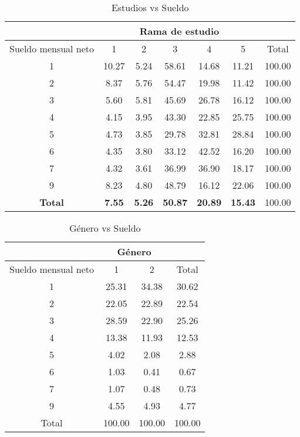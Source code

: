 \documentclass{article}
\begin{document}
\begin{table}[]
\centering
\caption{Estudios vs Sueldo}
\begin{tabular}{c|ccccc|c} \hline  \hline  
                                & \multicolumn{5}{c}{Rama de estudio}              &                     \\ \hline  
   Sueldo mensual neto                   & 1     & 2    & 3     & 4     & 5      & Total                \\ \hline  
1                               & 10.27 & 5.24 & 58.61 & 14.68 & 11.21  & 100.00               \\
2                               & 8.37  & 5.76 & 54.47 & 19.98 & 11.42  & 100.00               \\
3                               & 5.60  & 5.81 & 45.69 & 26.78 & 16.12  & 100.00               \\
4                               & 4.15  & 3.95 & 43.30 & 22.85 & 25.75  & 100.00               \\
5                               & 4.73  & 3.85 & 29.78 & 32.81 & 28.84  & 100.00               \\
6                               & 4.35  & 3.80 & 33.12 & 42.52 & 16.20  & 100.00               \\
7                               & 4.32  & 3.61 & 36.99 & 36.90 & 18.17  & 100.00               \\
9                               & 8.23  & 4.80 & 48.79 & 16.12 & 22.06  & 100.00               \\
\textbf{Total}                  & \textbf{7.55}  & \textbf{5.26} & \textbf{50.87} & \textbf{20.89} & \textbf{15.43}  & 100.00  \\ \hline  \hline  
\end{tabular}
\end{table}

\begin{table}[]
\centering
\caption{Género vs Sueldo}
\begin{tabular}{c|cc|c} \hline   \hline  
            & \multicolumn{2}{c}{Género}             &        \\ \hline  
Sueldo mensual neto  & 1      & 2       & Total  \\ \hline  
1           & 25.31  & 34.38   & 30.62  \\
2           & 22.05  & 22.89   & 22.54  \\
3           & 28.59  & 22.90   & 25.26  \\
4           & 13.38  & 11.93   & 12.53  \\
5           & 4.02   & 2.08    & 2.88   \\
6           & 1.03   & 0.41    & 0.67   \\
7           & 1.07   & 0.48    & 0.73   \\
9           & 4.55   & 4.93    & 4.77   \\
Total       & 100.00 & 100.00  & 100.00 \\ \hline  \hline  
\end{tabular}
\end{table}
\end{document}
